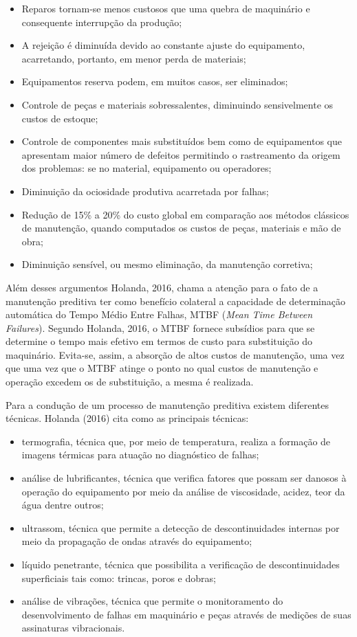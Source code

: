 \documentclass[
	12pt,				
	oneside,			
	a4paper,			
	english,			
	brazil,			
	]{abntex2ppgsi}
\begin{document}
\begin{itemize}
	\item Reparos tornam-se menos custosos que uma quebra de maquinário e consequente interrupção da produção;
	\item A rejeição é diminuída devido ao constante ajuste do equipamento, acarretando, portanto, em menor perda de materiais;
	\item Equipamentos reserva podem, em muitos casos, ser eliminados;
	\item Controle de peças e materiais sobressalentes, diminuindo sensivelmente os custos de estoque;
	\item Controle de componentes mais substituídos bem como de equipamentos que apresentam maior número de defeitos permitindo o rastreamento da origem dos problemas: se no material, equipamento ou operadores;
	\item Diminuição da ociosidade produtiva acarretada por falhas;
	\item Redução de 15\% a 20\% do custo global em comparação aos métodos clássicos de manutenção, quando computados os custos de peças, materiais e mão de obra;
	\item Diminuição sensível, ou mesmo eliminação, da manutenção corretiva;
\end{itemize}

Além desses argumentos Holanda, 2016, chama a atenção para o fato de a manutenção preditiva ter como benefício colateral a capacidade de determinação automática do Tempo Médio Entre Falhas, MTBF (\textit{Mean Time Between Failures}). Segundo Holanda, 2016, o MTBF fornece subsídios para que se determine o tempo mais efetivo em termos de custo para substituição do maquinário. Evita-se, assim, a absorção de altos custos de manutenção, uma vez que uma vez que o MTBF atinge o ponto no qual custos de manutenção e operação excedem os de substituição, a mesma é realizada. 

Para a condução de um processo de manutenção preditiva existem diferentes técnicas. Holanda (2016) cita como as principais técnicas: 
\begin{itemize}
	\item termografia, técnica que, por meio de temperatura, realiza a formação de imagens térmicas para atuação no diagnóstico de falhas; 
	\item análise de lubrificantes, técnica que verifica fatores que possam ser danosos à operação do equipamento por meio da análise de viscosidade, acidez, teor da água dentre outros; 
	\item ultrassom, técnica que permite a detecção de descontinuidades internas por meio da propagação de ondas através do equipamento; 
	\item líquido penetrante, técnica que possibilita a verificação de descontinuidades superficiais tais como: trincas, poros e dobras; 
	\item análise de vibrações, técnica que permite o monitoramento do desenvolvimento de falhas em maquinário e peças através de medições de suas assinaturas vibracionais. 
\end{itemize}
\end{document}
